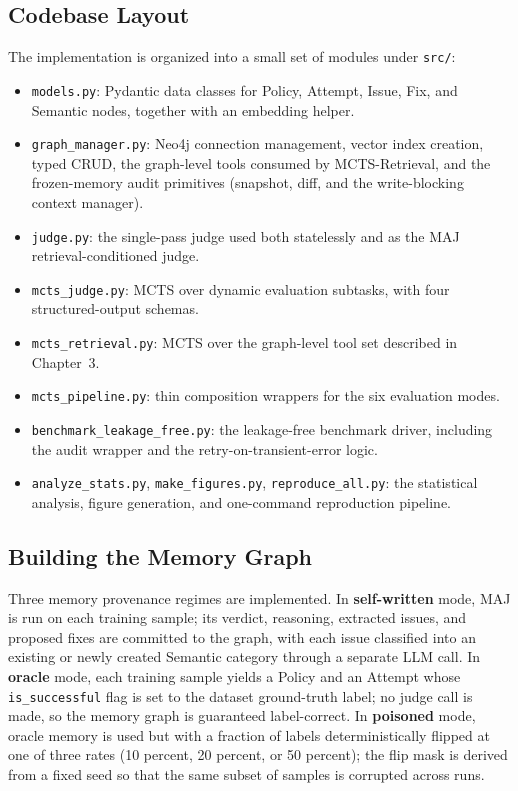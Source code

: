 \documentclass[12pt,a4paper]{report}
\begin{document}
\subsection{Codebase Layout}

The implementation is organized into a small set of modules under \texttt{src/}:
\begin{itemize}
    \item \texttt{models.py}: Pydantic data classes for Policy, Attempt, Issue, Fix, and Semantic nodes, together with an embedding helper.
    \item \texttt{graph\_manager.py}: Neo4j connection management, vector index creation, typed CRUD, the graph-level tools consumed by MCTS-Retrieval, and the frozen-memory audit primitives (snapshot, diff, and the write-blocking context manager).
    \item \texttt{judge.py}: the single-pass judge used both statelessly and as the MAJ retrieval-conditioned judge.
    \item \texttt{mcts\_judge.py}: MCTS over dynamic evaluation subtasks, with four structured-output schemas.
    \item \texttt{mcts\_retrieval.py}: MCTS over the graph-level tool set described in Chapter~3.
    \item \texttt{mcts\_pipeline.py}: thin composition wrappers for the six evaluation modes.
    \item \texttt{benchmark\_leakage\_free.py}: the leakage-free benchmark driver, including the audit wrapper and the retry-on-transient-error logic.
    \item \texttt{analyze\_stats.py}, \texttt{make\_figures.py}, \texttt{reproduce\_all.py}: the statistical analysis, figure generation, and one-command reproduction pipeline.
\end{itemize}

\subsection{Building the Memory Graph}

Three memory provenance regimes are implemented. In \textbf{self-written} mode, MAJ is run on each training sample; its verdict, reasoning, extracted issues, and proposed fixes are committed to the graph, with each issue classified into an existing or newly created Semantic category through a separate LLM call. In \textbf{oracle} mode, each training sample yields a Policy and an Attempt whose \texttt{is\_successful} flag is set to the dataset ground-truth label; no judge call is made, so the memory graph is guaranteed label-correct. In \textbf{poisoned} mode, oracle memory is used but with a fraction of labels deterministically flipped at one of three rates (10 percent, 20 percent, or 50 percent); the flip mask is derived from a fixed seed so that the same subset of samples is corrupted across runs.
\end{document}
